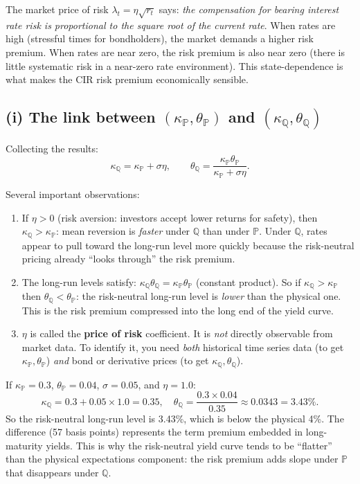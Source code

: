 \documentclass[11pt]{article}
\newcommand{\PP}{\mathbb{P}}
\newcommand{\QQ}{\mathbb{Q}}
\begin{document}
\begin{intuition}
The market price of risk $\lambda_t = \eta\sqrt{r_t}$ says: \emph{the
compensation for bearing interest rate risk is proportional to the square
root of the current rate}.  When rates are high (stressful times for
bondholders), the market demands a higher risk premium.  When rates are
near zero, the risk premium is also near zero (there is little systematic
risk in a near-zero rate environment).  This state-dependence is what
makes the CIR risk premium economically sensible.
\end{intuition}

\subsection{(i) The link between $(\kappa_\PP,\theta_\PP)$ and $(\kappa_\QQ,\theta_\QQ)$}

Collecting the results:
\[
\boxed{
\kappa_\QQ = \kappa_\PP + \sigma\eta,
\qquad
\theta_\QQ = \frac{\kappa_\PP\theta_\PP}{\kappa_\PP + \sigma\eta}.
}
\]

Several important observations:

\begin{enumerate}
  \item If $\eta > 0$ (risk aversion: investors accept lower returns
  for safety), then $\kappa_\QQ > \kappa_\PP$: mean reversion is
  \emph{faster} under $\QQ$ than under $\PP$.  Under $\QQ$, rates appear
  to pull toward the long-run level more quickly because the risk-neutral
  pricing already ``looks through'' the risk premium.

  \item The long-run levels satisfy:
  $\kappa_\QQ\theta_\QQ = \kappa_\PP\theta_\PP$ (constant product).  So if
  $\kappa_\QQ > \kappa_\PP$ then $\theta_\QQ < \theta_\PP$: the
  risk-neutral long-run level is \emph{lower} than the physical one.
  This is the risk premium compressed into the long end of the yield
  curve.

  \item $\eta$ is called the \textbf{price of risk} coefficient.  It is
  \emph{not} directly observable from market data.  To identify it, you
  need \emph{both} historical time series data (to get $\kappa_\PP,\theta_\PP$)
  \emph{and} bond or derivative prices (to get $\kappa_\QQ,\theta_\QQ$).
\end{enumerate}

\begin{example_box}
If $\kappa_\PP=0.3$, $\theta_\PP=0.04$, $\sigma=0.05$, and $\eta=1.0$:
\[
\kappa_\QQ = 0.3 + 0.05\times 1.0 = 0.35,
\quad
\theta_\QQ = \frac{0.3\times 0.04}{0.35} \approx 0.0343 = 3.43\%.
\]
So the risk-neutral long-run level is 3.43\%, which is below the physical
4\%.  The difference (57 basis points) represents the term premium embedded
in long-maturity yields.  This is why the risk-neutral yield curve tends
to be ``flatter'' than the physical expectations component: the risk premium
adds slope under $\PP$ that disappears under $\QQ$.
\end{example_box}
\end{document}
